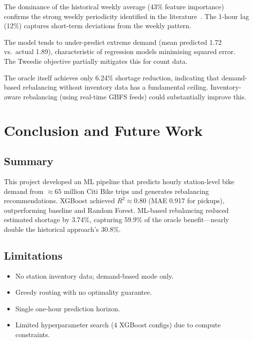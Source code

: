 \documentclass[12pt,a4paper]{report}
\begin{document}
The dominance of the historical weekly average (43\% feature
importance) confirms the strong weekly periodicity identified in the
literature~\cite{borgnat2011}. The 1-hour lag (12\%) captures
short-term deviations from the weekly pattern.

The model tends to under-predict extreme demand (mean predicted 1.72
vs.\ actual 1.89), characteristic of regression models minimising
squared error. The Tweedie objective partially mitigates this for
count data.

The oracle itself achieves only 6.24\% shortage reduction, indicating
that demand-based rebalancing without inventory data has a fundamental
ceiling. Inventory-aware rebalancing (using real-time GBFS feeds)
could substantially improve this.

\chapter{Conclusion and Future Work}

\section{Summary}

This project developed an ML pipeline that predicts hourly
station-level bike demand from $\approx 65$ million Citi Bike trips
and generates rebalancing recommendations. XGBoost achieved $R^2
\approx 0.80$ (MAE 0.917 for pickups), outperforming baseline and
Random Forest. ML-based rebalancing reduced estimated shortage by
3.74\%, capturing 59.9\% of the oracle benefit---nearly double the
historical approach's 30.8\%.

\section{Limitations}

\begin{itemize}
  \item No station inventory data; demand-based mode only.
  \item Greedy routing with no optimality guarantee.
  \item Single one-hour prediction horizon.
  \item Limited hyperparameter search (4 XGBoost configs) due to
        compute constraints.
\end{itemize}
\end{document}
